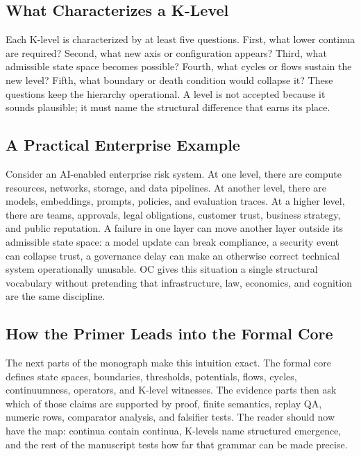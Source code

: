\subsection{What Characterizes a K-Level}

Each K-level is characterized by at least five questions. First, what lower
continua are required? Second, what new axis or configuration appears? Third,
what admissible state space becomes possible? Fourth, what cycles or flows
sustain the new level? Fifth, what boundary or death condition would collapse
it? These questions keep the hierarchy operational. A level is not accepted
because it sounds plausible; it must name the structural difference that earns
its place.

\subsection{A Practical Enterprise Example}

Consider an AI-enabled enterprise risk system. At one level, there are compute
resources, networks, storage, and data pipelines. At another level, there are
models, embeddings, prompts, policies, and evaluation traces. At a higher
level, there are teams, approvals, legal obligations, customer trust, business
strategy, and public reputation. A failure in one layer can move another layer
outside its admissible state space: a model update can break compliance, a
security event can collapse trust, a governance delay can make an otherwise
correct technical system operationally unusable. OC gives this situation a
single structural vocabulary without pretending that infrastructure, law,
economics, and cognition are the same discipline.

\subsection{How the Primer Leads into the Formal Core}

The next parts of the monograph make this intuition exact. The formal core
defines state spaces, boundaries, thresholds, potentials, flows, cycles,
continuumness, operators, and K-level witnesses. The evidence parts then ask
which of those claims are supported by proof, finite semantics, replay QA,
numeric rows, comparator analysis, and falsifier tests. The reader should now
have the map: continua contain continua, K-levels name structured emergence,
and the rest of the manuscript tests how far that grammar can be made precise.


